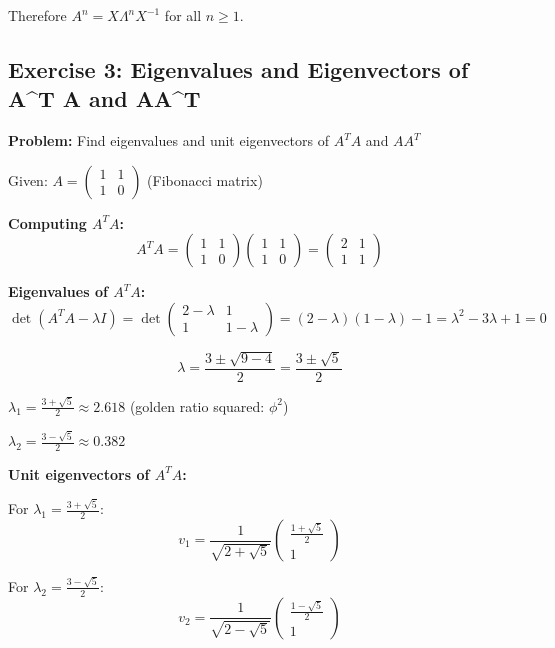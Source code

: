\documentclass[12pt,a4paper]{article}
\begin{document}
Therefore \textbf{$A^n = X\Lambda^nX^{-1}$} for all $n \geq 1$.

\subsection{Exercise 3: Eigenvalues and Eigenvectors of A^T A and AA^T}

\textbf{Problem:} Find eigenvalues and unit eigenvectors of $A^T A$ and $AA^T$

Given: $A = \begin{pmatrix} 1 & 1 \\ 1 & 0 \end{pmatrix}$ (Fibonacci matrix)

\textbf{Computing $A^T A$:}
$$A^T A = \begin{pmatrix} 1 & 1 \\ 1 & 0 \end{pmatrix}\begin{pmatrix} 1 & 1 \\ 1 & 0 \end{pmatrix} = \begin{pmatrix} 2 & 1 \\ 1 & 1 \end{pmatrix}$$

\textbf{Eigenvalues of $A^T A$:}
$$\det(A^T A - \lambda I) = \det\begin{pmatrix} 2-\lambda & 1 \\ 1 & 1-\lambda \end{pmatrix} = (2-\lambda)(1-\lambda) - 1 = \lambda^2 - 3\lambda + 1 = 0$$

$$\lambda = \frac{3 \pm \sqrt{9-4}}{2} = \frac{3 \pm \sqrt{5}}{2}$$

\textbf{$\lambda_1 = \frac{3+\sqrt{5}}{2} \approx 2.618$} (golden ratio squared: $\phi^2$)

\textbf{$\lambda_2 = \frac{3-\sqrt{5}}{2} \approx 0.382$}

\textbf{Unit eigenvectors of $A^T A$:}

For $\lambda_1 = \frac{3+\sqrt{5}}{2}$:
$$v_1 = \frac{1}{\sqrt{2+\sqrt{5}}}\begin{pmatrix} \frac{1+\sqrt{5}}{2} \\ 1 \end{pmatrix}$$

For $\lambda_2 = \frac{3-\sqrt{5}}{2}$:
$$v_2 = \frac{1}{\sqrt{2-\sqrt{5}}}\begin{pmatrix} \frac{1-\sqrt{5}}{2} \\ 1 \end{pmatrix}$$
\end{document}
